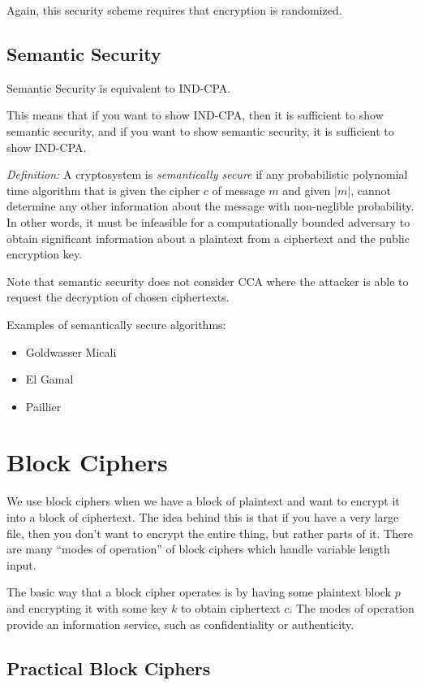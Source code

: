 \documentclass[psamsfonts]{amsart}
\begin{document}
Again, this security scheme requires that encryption is randomized.

\subsection{Semantic Security}

Semantic Security is equivalent to IND-CPA.

This means that if you want to show IND-CPA, then it is sufficient to show semantic security, and if you want to show semantic security, it is sufficient to show IND-CPA.

\emph{Definition:} A cryptosystem is \emph{semantically secure} if any probabilistic polynomial time algorithm that is given the cipher $c$ of message $m$ and given $|m|$, cannot determine any other information about the message with non-neglible probability. In other words, it must be infeasible for a computationally bounded adversary to obtain significant information about a plaintext from a ciphertext and the public encryption key.

Note that semantic security does not consider CCA where the attacker is able to request the decryption of chosen ciphertexts.

Examples of semantically secure algorithms:
\begin{itemize}
  \item Goldwasser Micali
  \item El Gamal
  \item Paillier
\end{itemize}

\newpage

\section{Block Ciphers}

We use block ciphers when we have a block of plaintext and want to encrypt it into a block of ciphertext. The idea behind this is that if you have a very large file, then you don't want to encrypt the entire thing, but rather parts of it. There are many ``modes of operation'' of block ciphers which handle variable length input.

The basic way that a block cipher operates is by having some plaintext block $p$ and encrypting it with some key $k$ to obtain ciphertext $c$. The modes of operation provide an information service, such as confidentiality or authenticity.

\subsection{Practical Block Ciphers}
\end{document}

